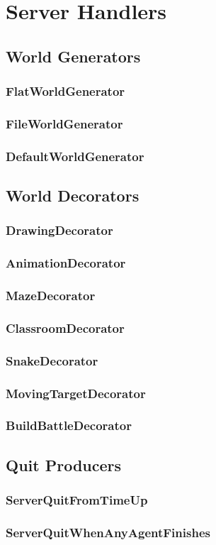 \documentclass[11pt]{article} %
\begin{document}
\section{Server Handlers}

\subsection{World Generators}

\subsubsection{FlatWorldGenerator}
\subsubsection{FileWorldGenerator}
\subsubsection{DefaultWorldGenerator}

\subsection{World Decorators}

\subsubsection{DrawingDecorator}
\subsubsection{AnimationDecorator}
\subsubsection{MazeDecorator}
\subsubsection{ClassroomDecorator}
\subsubsection{SnakeDecorator}
\subsubsection{MovingTargetDecorator}
\subsubsection{BuildBattleDecorator}

\subsection{Quit Producers}

\subsubsection{ServerQuitFromTimeUp}
\subsubsection{ServerQuitWhenAnyAgentFinishes}
\end{document}

